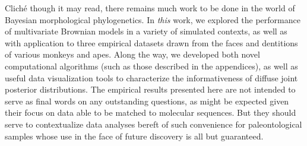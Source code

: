 Cliché though it may read, there remains much work to be done in the world of Bayesian morphological phylogenetics. In \textit{this} work, we explored the performance of multivariate Brownian models in a variety of simulated contexts, as well as with application to three empirical datasets drawn from the faces and dentitions of various monkeys and apes. Along the way, we developed both novel computational algorithms (such as those described in the appendices), as well as useful data visualization tools to characterize the informativeness of diffuse joint posterior distributions. The empirical results presented here are not intended to serve as final words on any outstanding questions, as might be expected given their focus on data able to be matched to molecular sequences. But they should serve to contextualize data analyses bereft of such convenience for paleontological samples whose use in the face of future discovery is all but guaranteed.

\clearpage


